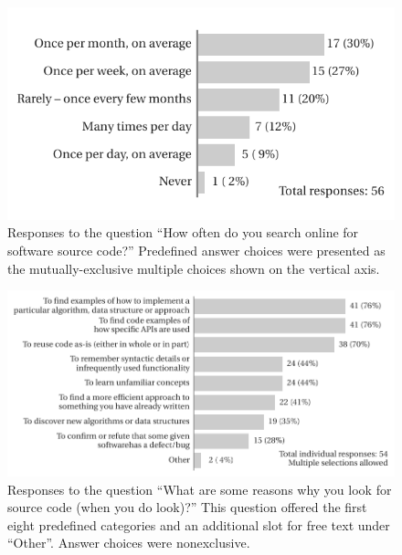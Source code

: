 \documentclass{casicswhitepaper}
\begin{document}
\begin{figure}[bht]
  \vspace*{-2ex}
  \centering
  \hspace*{-10pt}\includegraphics{files/plots/bar-graph-how-often-src.pdf}
  \vspace*{-3ex}
  \caption{Responses to the question  ``How often do you search online for software source code?''  Predefined answer choices were presented as the mutually-exclusive multiple choices shown on the vertical axis.}
  \label{how-often-search-for-src}
\end{figure}

\begin{figure}[hb]
  \vspace*{-3ex}
  \centering
  \includegraphics{files/plots/bar-graph-why-search-for-src.pdf}
  \vspace*{-2ex}
  \caption{Responses to the question ``What are some reasons why you look for source code (when you do look)?''  This question offered the first eight predefined categories and an additional slot for free text under ``Other''.  Answer choices were nonexclusive.}
  \label{why-search-for-src}
\end{figure}
\end{document}
